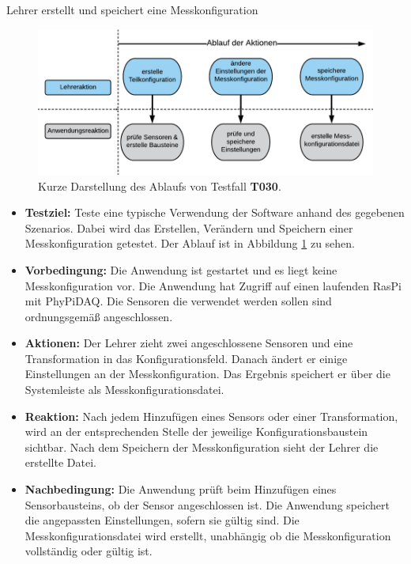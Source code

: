 \documentclass[parskip=full]{scrartcl}
\begin{document}
\begin{description}
\begin{itemize}
\end{itemize}



\hypertarget{link-t030}{\item[T030]} Lehrer erstellt und speichert eine Messkonfiguration

\begin{figure}[htbp]
	\begin{center}
		\includegraphics[width = 13cm]{Grafik/T030-Ablauf.png}
		\caption{Kurze Darstellung des Ablaufs von Testfall \textbf{T030}.}
		\label{T030-Ablauf}
	\end{center}
\end{figure}




\begin{itemize}

\item []\textbf{Testziel:} Teste eine typische Verwendung der Software anhand des gegebenen Szenarios. Dabei wird das Erstellen, Verändern und Speichern einer Messkonfiguration getestet. Der Ablauf ist in Abbildung \ref{T030-Ablauf} zu sehen.

\item []\textbf{Vorbedingung:} Die Anwendung ist gestartet und es liegt keine Messkonfiguration vor. Die Anwendung hat Zugriff auf einen laufenden \gls{RasPi} mit \gls{PhyPiDAQ}. Die Sensoren die verwendet werden sollen sind ordnungsgemäß angeschlossen.
\item []\textbf{Aktionen:} Der Lehrer zieht zwei angeschlossene Sensoren und eine Transformation in das Konfigurationsfeld. Danach ändert er einige Einstellungen an der Messkonfiguration. Das Ergebnis speichert er über die Systemleiste als Messkonfigurationsdatei.
\item []\textbf{Reaktion:} Nach jedem Hinzufügen eines Sensors oder einer Transformation, wird an der entsprechenden Stelle der jeweilige Konfigurationsbaustein sichtbar. Nach dem Speichern der Messkonfiguration sieht der Lehrer die erstellte Datei.
\item []\textbf{Nachbedingung:} Die Anwendung prüft beim Hinzufügen eines Sensorbausteins, ob der Sensor angeschlossen ist. Die Anwendung speichert die angepassten Einstellungen, sofern sie gültig sind. Die Messkonfigurationsdatei wird erstellt, unabhängig ob die Messkonfiguration vollständig oder gültig ist.


\end{itemize}
\end{description}
\end{document}
